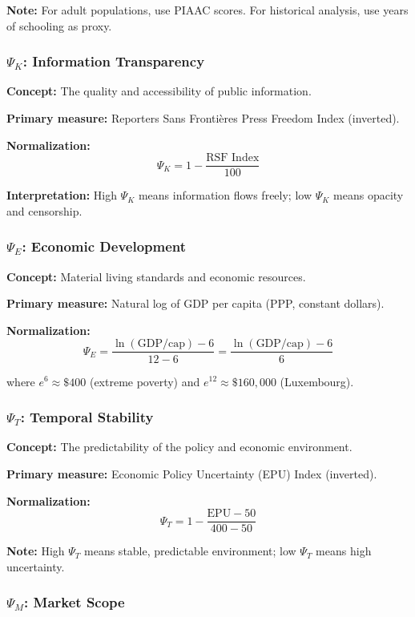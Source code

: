 \textbf{Note:} For adult populations, use PIAAC scores. For historical analysis, 
use years of schooling as proxy.

\subsubsection{$\Psi_K$: Information Transparency}

\textbf{Concept:} The quality and accessibility of public information.

\textbf{Primary measure:} Reporters Sans Frontières Press Freedom Index (inverted).

\textbf{Normalization:}
\[
\Psi_K = 1 - \frac{\text{RSF Index}}{100}
\]

\textbf{Interpretation:} High $\Psi_K$ means information flows freely; 
low $\Psi_K$ means opacity and censorship.

\subsubsection{$\Psi_E$: Economic Development}

\textbf{Concept:} Material living standards and economic resources.

\textbf{Primary measure:} Natural log of GDP per capita (PPP, constant dollars).

\textbf{Normalization:}
\[
\Psi_E = \frac{\ln(\text{GDP/cap}) - 6}{12 - 6} = \frac{\ln(\text{GDP/cap}) - 6}{6}
\]

where $e^6 \approx \$400$ (extreme poverty) and $e^{12} \approx \$160,000$ (Luxembourg).

\subsubsection{$\Psi_T$: Temporal Stability}

\textbf{Concept:} The predictability of the policy and economic environment.

\textbf{Primary measure:} Economic Policy Uncertainty (EPU) Index (inverted).

\textbf{Normalization:}
\[
\Psi_T = 1 - \frac{\text{EPU} - 50}{400 - 50}
\]

\textbf{Note:} High $\Psi_T$ means stable, predictable environment; 
low $\Psi_T$ means high uncertainty.

\subsubsection{$\Psi_M$: Market Scope}

